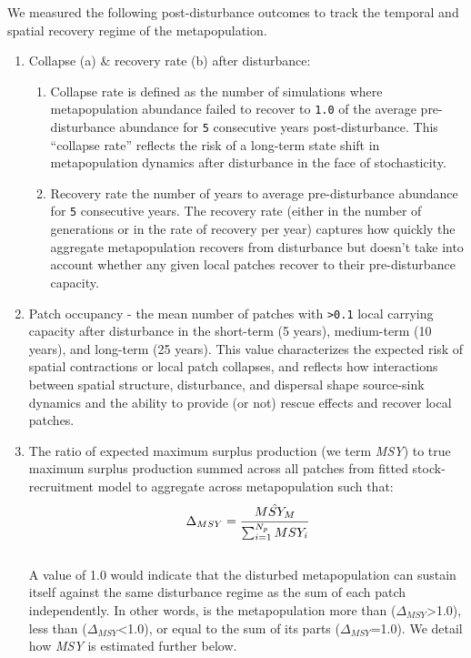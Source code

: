 \documentclass[
]{article}
\providecommand{\tightlist}{%
  \setlength{\itemsep}{0pt}\setlength{\parskip}{0pt}}
\begin{document}
We measured the following post-disturbance outcomes to track the
temporal and spatial recovery regime of the metapopulation.

\begin{enumerate}
\def\labelenumi{\arabic{enumi}.}
\item
  Collapse (a) \& recovery rate (b) after disturbance:

  \begin{enumerate}
  \def\labelenumii{\alph{enumii}.}
  \tightlist
  \item
    Collapse rate is defined as the number of simulations where
    metapopulation abundance failed to recover to \texttt{1.0} of the
    average pre-disturbance abundance for \texttt{5} consecutive years
    post-disturbance. This ``collapse rate'' reflects the risk of a
    long-term state shift in metapopulation dynamics after disturbance
    in the face of stochasticity.
  \item
    Recovery rate the number of years to average pre-disturbance
    abundance for \texttt{5} consecutive years. The recovery rate
    (either in the number of generations or in the rate of recovery per
    year) captures how quickly the aggregate metapopulation recovers
    from disturbance but doesn't take into account whether any given
    local patches recover to their pre-disturbance capacity.
  \end{enumerate}
\item
  Patch occupancy - the mean number of patches with
  \texttt{\textgreater{}0.1} local carrying capacity after disturbance
  in the short-term (5 years), medium-term (10 years), and long-term (25
  years). This value characterizes the expected risk of spatial
  contractions or local patch collapses, and reflects how interactions
  between spatial structure, disturbance, and dispersal shape
  source-sink dynamics and the ability to provide (or not) rescue
  effects and recover local patches.
\item
  The ratio of expected maximum surplus production (we term \emph{MSY})
  to true maximum surplus production summed across all patches from
  fitted stock-recruitment model to aggregate across metapopulation such
  that:\\
  \begin{align}
  \Delta_{MSY}=\cfrac{\hat{MSY_M}}{\sum_{i=1}^{N_p} MSY_{i}}
  \end{align}\\
  A value of 1.0 would indicate that the disturbed metapopulation can
  sustain itself against the same disturbance regime as the sum of each
  patch independently. In other words, is the metapopulation more than
  (\(\Delta_{MSY}\)\textgreater1.0), less than
  (\(\Delta_{MSY}\)\textless1.0), or equal to the sum of its parts
  (\(\Delta_{MSY}\)=1.0). We detail how \emph{MSY} is estimated further
  below.
\end{enumerate}
\end{document}
